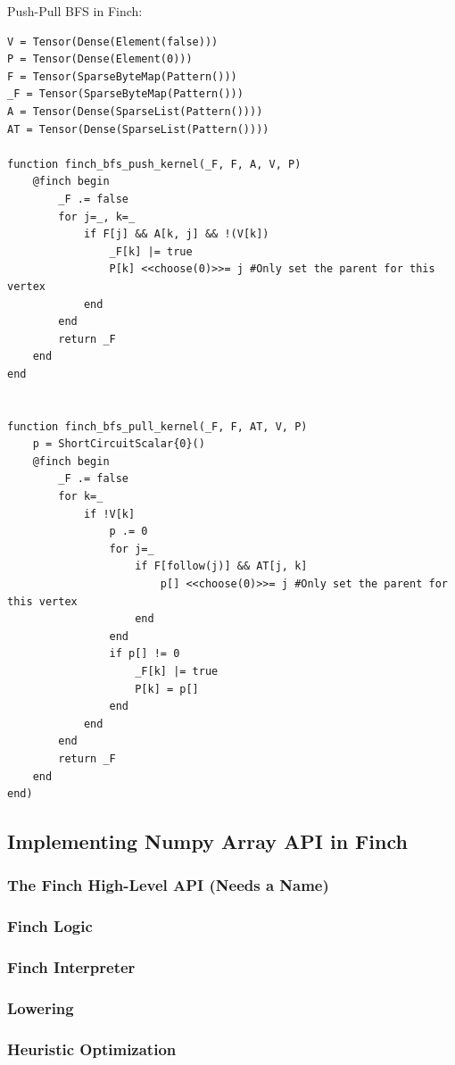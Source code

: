 \documentclass[acmsmall]{acmart}
\begin{document}
Push-Pull BFS in Finch:
\begin{verbatim}
V = Tensor(Dense(Element(false)))
P = Tensor(Dense(Element(0)))
F = Tensor(SparseByteMap(Pattern()))
_F = Tensor(SparseByteMap(Pattern()))
A = Tensor(Dense(SparseList(Pattern())))
AT = Tensor(Dense(SparseList(Pattern())))

function finch_bfs_push_kernel(_F, F, A, V, P)
    @finch begin
        _F .= false
        for j=_, k=_
            if F[j] && A[k, j] && !(V[k])
                _F[k] |= true
                P[k] <<choose(0)>>= j #Only set the parent for this vertex
            end
        end
        return _F
    end
end


function finch_bfs_pull_kernel(_F, F, AT, V, P)
    p = ShortCircuitScalar{0}()
    @finch begin
        _F .= false
        for k=_
            if !V[k]
                p .= 0
                for j=_
                    if F[follow(j)] && AT[j, k]
                        p[] <<choose(0)>>= j #Only set the parent for this vertex
                    end
                end
                if p[] != 0
                    _F[k] |= true
                    P[k] = p[]
                end
            end
        end
        return _F
    end
end)
\end{verbatim}

\subsection{Implementing Numpy Array API in Finch}
\subsubsection{The Finch High-Level API (Needs a Name)}

\subsubsection{Finch Logic}

\subsubsection{Finch Interpreter}

\subsubsection{Lowering}
\subsubsection{Heuristic Optimization}
\end{document}
